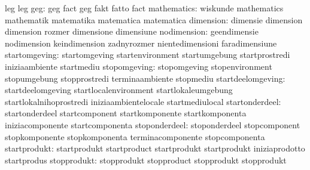                                   leg                              leg
                             geg: geg                              fact
                                  geg                              fakt
                                  fatto                            fact
                     mathematics: wiskunde                         mathematics
                                  mathematik                       matematika
                                  matematica                       matematica
                       dimension: dimensie                         dimension
                                  dimension                        rozmer
                                  dimensione                       dimensiune
                     nodimension: geendimensie                     nodimension
                                  keindimension                    zadnyrozmer
                                  nientedimensioni                 faradimensiune
                   startomgeving: startomgeving                    startenvironment
                                  startumgebung                    startprostredi
                                  iniziaambiente                   startmediu
                    stopomgeving: stopomgeving                     stopenvironment
                                  stopumgebung                     stopprostredi
                                  terminaambiente                  stopmediu
               startdeelomgeving: startdeelomgeving                startlocalenvironment
                                  startlokaleumgebung              startlokalnihoprostredi
                                  iniziaambientelocale             startmediulocal
                  startonderdeel: startonderdeel                   startcomponent
                                  startkomponente                  startkomponenta
                                  iniziacomponente                 startcomponenta
                   stoponderdeel: stoponderdeel                    stopcomponent
                                  stopkomponente                   stopkomponenta
                                  terminacomponente                stopcomponenta
                    startprodukt: startprodukt                     startproduct
                                  startprodukt                     startprodukt
                                  iniziaprodotto                   startprodus
                     stopprodukt: stopprodukt                      stopproduct
                                  stopprodukt                      stopprodukt
